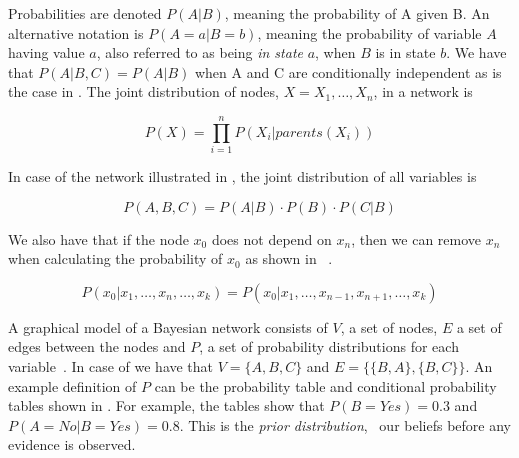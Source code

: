 Probabilities are denoted $P(A|B)$, meaning the probability of A given B. An alternative notation is $P(A=a|B=b)$, meaning the probability of variable $A$ having value $a$, also referred to as being \emph{in state} $a$, when $B$ is in state $b$. We have that $P(A|B,C) = P(A|B)$ when A and C are conditionally independent as is the case in . The joint distribution of nodes, $X = X_1,\ldots,X_n$, in a network is

\begin{equation}
\label{eq:analysis:bayesian-network:prod}
P(X) = \displaystyle \prod_{i=1}^{n} P(X_i|parents(X_i))
\end{equation}

In case of the network illustrated in , the joint distribution of all variables is

\begin{equation}
P(A, B, C) = P(A|B) \cdot P(B) \cdot P(C|B)
\end{equation}

We also have that if the node $x_0$ does not depend on $x_n$, then we can remove $x_n$ when calculating the probability of $x_0$ as shown in ~\cite{stephenson2000introduction}.

\begin{equation}
\label{eq:analysis:bayesian-network:not-child}
P(x_0|x_1,\ldots,x_n,\ldots,x_k) = P(x_0|x_1,\ldots,x_{n-1},x_{n+1},\ldots,x_k)
\end{equation}

A graphical model of a Bayesian network consists of $V$, a set of nodes, $E$ a set of edges between the nodes and $P$, a set of probability distributions for each variable~\cite{stephenson2000introduction}. In case of  we have that $V = \{A, B, C\}$ and $E = \{\{B, A\}, \{B,C\}\}$. An example definition of $P$ can be the probability table and conditional probability tables shown in . For example, the tables show that $P(B=Yes) = 0.3$ and $P(A=No|B=Yes) = 0.8$. This is the \emph{prior distribution}, \ie~our beliefs before any evidence is observed.

